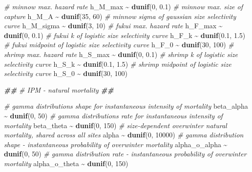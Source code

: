 \documentclass[
]{article}
\newenvironment{Shaded}{\begin{snugshade}}{\end{snugshade}}
\newcommand{\CommentTok}[1]{\textcolor[rgb]{0.56,0.35,0.01}{\textit{#1}}}
\newcommand{\DecValTok}[1]{\textcolor[rgb]{0.00,0.00,0.81}{#1}}
\newcommand{\DocumentationTok}[1]{\textcolor[rgb]{0.56,0.35,0.01}{\textbf{\textit{#1}}}}
\newcommand{\FloatTok}[1]{\textcolor[rgb]{0.00,0.00,0.81}{#1}}
\newcommand{\FunctionTok}[1]{\textcolor[rgb]{0.13,0.29,0.53}{\textbf{#1}}}
\newcommand{\NormalTok}[1]{#1}
\newcommand{\SpecialCharTok}[1]{\textcolor[rgb]{0.81,0.36,0.00}{\textbf{#1}}}
\begin{document}
\begin{Shaded}
\begin{Highlighting}[]
  \CommentTok{\# minnow max. hazard rate}
\NormalTok{  h\_M\_max }\SpecialCharTok{\textasciitilde{}} \FunctionTok{dunif}\NormalTok{(}\DecValTok{0}\NormalTok{, }\FloatTok{0.1}\NormalTok{)}
  \CommentTok{\# minnow max. size of capture}
\NormalTok{  h\_M\_A }\SpecialCharTok{\textasciitilde{}} \FunctionTok{dunif}\NormalTok{(}\DecValTok{35}\NormalTok{, }\DecValTok{60}\NormalTok{)}
  \CommentTok{\# minnow sigma of gaussian size selectivity curve}
\NormalTok{  h\_M\_sigma }\SpecialCharTok{\textasciitilde{}} \FunctionTok{dunif}\NormalTok{(}\DecValTok{3}\NormalTok{, }\DecValTok{10}\NormalTok{)}
  \CommentTok{\# fukui max. hazard rate}
\NormalTok{  h\_F\_max }\SpecialCharTok{\textasciitilde{}} \FunctionTok{dunif}\NormalTok{(}\DecValTok{0}\NormalTok{, }\FloatTok{0.1}\NormalTok{)}
  \CommentTok{\# fukui k of logistic size selectivity curve}
\NormalTok{  h\_F\_k }\SpecialCharTok{\textasciitilde{}} \FunctionTok{dunif}\NormalTok{(}\FloatTok{0.1}\NormalTok{, }\FloatTok{1.5}\NormalTok{)}
  \CommentTok{\# fukui midpoint of logistic size selectivity curve}
\NormalTok{  h\_F\_0 }\SpecialCharTok{\textasciitilde{}} \FunctionTok{dunif}\NormalTok{(}\DecValTok{30}\NormalTok{, }\DecValTok{100}\NormalTok{)}
  \CommentTok{\# shrimp max. hazard rate}
\NormalTok{  h\_S\_max }\SpecialCharTok{\textasciitilde{}} \FunctionTok{dunif}\NormalTok{(}\DecValTok{0}\NormalTok{, }\FloatTok{0.1}\NormalTok{)}
  \CommentTok{\# shrimp k of logistic size selectivity curve}
\NormalTok{  h\_S\_k }\SpecialCharTok{\textasciitilde{}} \FunctionTok{dunif}\NormalTok{(}\FloatTok{0.1}\NormalTok{, }\FloatTok{1.5}\NormalTok{)}
  \CommentTok{\# shrimp midpoint of logistic size selectivity curve}
\NormalTok{  h\_S\_0 }\SpecialCharTok{\textasciitilde{}} \FunctionTok{dunif}\NormalTok{(}\DecValTok{30}\NormalTok{, }\DecValTok{100}\NormalTok{)}
  
  \DocumentationTok{\#\#}
  \CommentTok{\# IPM {-} natural mortality}
  \DocumentationTok{\#\#}
  
  \CommentTok{\# gamma distributions shape for instantaneous intensity of mortality}
\NormalTok{  beta\_alpha }\SpecialCharTok{\textasciitilde{}} \FunctionTok{dunif}\NormalTok{(}\DecValTok{0}\NormalTok{, }\DecValTok{50}\NormalTok{)}
  \CommentTok{\# gamma distributions rate for instantaneous intensity of mortality}
\NormalTok{  beta\_theta }\SpecialCharTok{\textasciitilde{}} \FunctionTok{dunif}\NormalTok{(}\DecValTok{0}\NormalTok{, }\DecValTok{150}\NormalTok{)}
  \CommentTok{\# size{-}dependent overwinter natural mortality, shared across all sites}
\NormalTok{  alpha }\SpecialCharTok{\textasciitilde{}} \FunctionTok{dunif}\NormalTok{(}\DecValTok{0}\NormalTok{, }\DecValTok{10000}\NormalTok{)}
  \CommentTok{\# gamma distribution shape {-} instantaneous probability of overwinter mortality}
\NormalTok{  alpha\_o\_alpha }\SpecialCharTok{\textasciitilde{}} \FunctionTok{dunif}\NormalTok{(}\DecValTok{0}\NormalTok{, }\DecValTok{50}\NormalTok{)}
  \CommentTok{\# gamma distribution rate {-} instantaneous probability of overwinter mortality}
\NormalTok{  alpha\_o\_theta }\SpecialCharTok{\textasciitilde{}} \FunctionTok{dunif}\NormalTok{(}\DecValTok{0}\NormalTok{, }\DecValTok{150}\NormalTok{)}
  

\end{Highlighting}
\end{Shaded}
\end{document}
